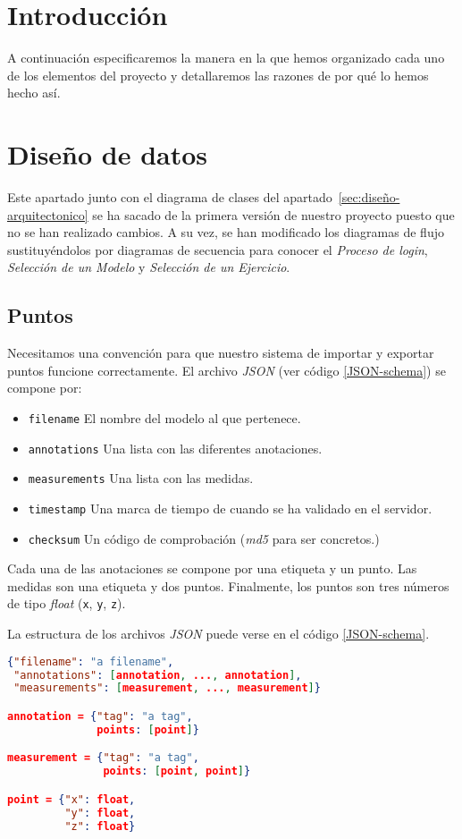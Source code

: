 
\section{Introducción}
A continuación especificaremos la manera en la que hemos organizado cada uno de los elementos del proyecto y detallaremos las razones de por qué lo hemos hecho así.

\section{Diseño de datos}
Este apartado junto con el diagrama de clases del apartado~\ref{sec:diseño-arquitectonico} se ha sacado de la primera versión de nuestro proyecto puesto que no se han realizado cambios. A su vez, se han modificado los diagramas de flujo sustituyéndolos por diagramas de secuencia para conocer el \textit{Proceso de login}, \textit{Selección de un Modelo} y \textit{Selección de un Ejercicio}.

\subsection{Puntos}
Necesitamos una convención para que nuestro sistema de importar y exportar puntos funcione correctamente. El archivo \textit{JSON} (ver código \ref{JSON-schema}) se compone por:
\begin{itemize}
	\item \texttt{filename} El nombre del modelo al que pertenece.
	\item \texttt{annotations} Una lista con las diferentes anotaciones.
	\item \texttt{measurements} Una lista con las medidas.
	\item \texttt{timestamp} Una marca de tiempo de cuando se ha validado en el servidor.
	\item \texttt{checksum} Un código de comprobación (\textit{md5} para ser concretos.)
\end{itemize}
Cada una de las anotaciones se compone por una etiqueta y un punto. Las medidas son una etiqueta y dos puntos. Finalmente, los puntos son tres números de tipo \textit{float} (\texttt{x}, \texttt{y}, \texttt{z}).

La estructura de los archivos \textit{JSON} puede verse en el código \ref{JSON-schema}.

\begin{lstlisting}[language=json, float, caption=Esquema JSON, label=JSON-schema]
{"filename": "a filename",
 "annotations": [annotation, ..., annotation],
 "measurements": [measurement, ..., measurement]}

annotation = {"tag": "a tag",
			  points: [point]}

measurement = {"tag": "a tag",
			   points: [point, point]}

point = {"x": float,
		 "y": float,
		 "z": float}
\end{lstlisting}

